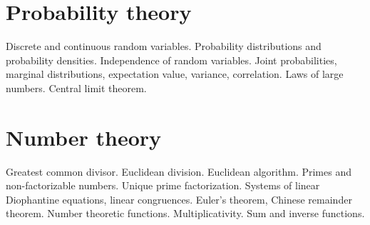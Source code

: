 \documentclass{article}
\begin{document}
\section{Probability theory}

Discrete and continuous random variables. Probability distributions and probability densities. Independence of random variables. Joint probabilities, marginal distributions, expectation value, variance, correlation. Laws of large numbers. Central limit theorem.


\section{Number theory}

Greatest common divisor. Euclidean division. Euclidean algorithm. Primes and non-factorizable numbers. Unique prime factorization. Systems of linear Diophantine equations, linear congruences. Euler’s theorem, Chinese remainder theorem. Number theoretic functions. Multiplicativity. Sum and inverse functions.
\end{document}
